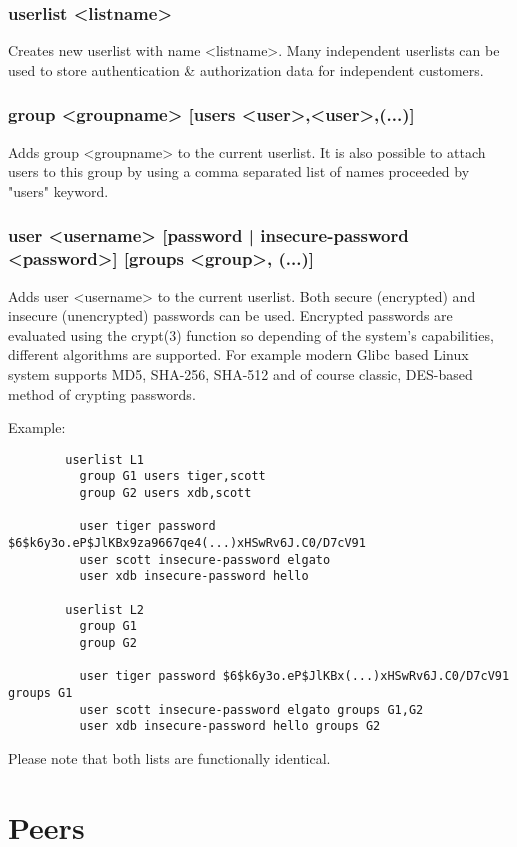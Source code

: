 \subsubsection[userlist]{userlist <listname>}
  Creates new userlist with name <listname>. Many independent userlists can be
  used to store authentication \& authorization data for independent customers.

\subsubsection[group]{group <groupname> [users <user>,<user>,(...)]}
  Adds group <groupname> to the current userlist. It is also possible to
  attach users to this group by using a comma separated list of names
  proceeded by "users" keyword.

\subsubsection[user]{user <username> [password | insecure-password <password>]
  [groups <group>, (...)]}
  Adds user <username> to the current userlist. Both secure (encrypted) and
  insecure (unencrypted) passwords can be used. Encrypted passwords are
  evaluated using the crypt(3) function so depending of the system's
  capabilities, different algorithms are supported. For example modern Glibc
  based Linux system supports MD5, SHA-256, SHA-512 and of course classic,
  DES-based method of crypting passwords.

  Example:
\begin{verbatim}
        userlist L1
          group G1 users tiger,scott
          group G2 users xdb,scott

          user tiger password $6$k6y3o.eP$JlKBx9za9667qe4(...)xHSwRv6J.C0/D7cV91
          user scott insecure-password elgato
          user xdb insecure-password hello

        userlist L2
          group G1
          group G2

          user tiger password $6$k6y3o.eP$JlKBx(...)xHSwRv6J.C0/D7cV91 groups G1
          user scott insecure-password elgato groups G1,G2
          user xdb insecure-password hello groups G2
\end{verbatim}

  Please note that both lists are functionally identical.

\section{Peers}

